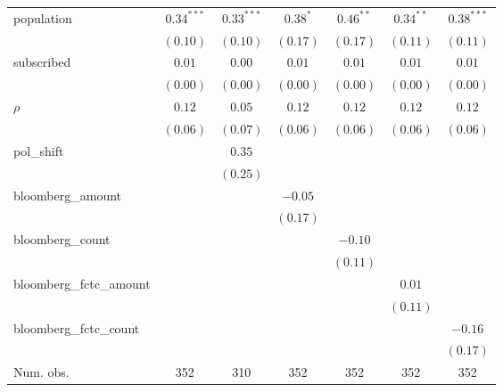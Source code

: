 \begin{table}[!h]
\begin{center}
\begin{tabular}{l c c c c c c }
population              & $0.34^{***}$ & $0.33^{***}$ & $0.38^{*}$   & $0.46^{**}$  & $0.34^{**}$  & $0.38^{***}$ \\
                        & $(0.10)$     & $(0.10)$     & $(0.17)$     & $(0.17)$     & $(0.11)$     & $(0.11)$     \\
subscribed              & $0.01$       & $0.00$       & $0.01$       & $0.01$       & $0.01$       & $0.01$       \\
                        & $(0.00)$     & $(0.00)$     & $(0.00)$     & $(0.00)$     & $(0.00)$     & $(0.00)$     \\
$\rho$                  & $0.12$       & $0.05$       & $0.12$       & $0.12$       & $0.12$       & $0.12$       \\
                        & $(0.06)$     & $(0.07)$     & $(0.06)$     & $(0.06)$     & $(0.06)$     & $(0.06)$     \\
pol\_shift              &              & $0.35$       &              &              &              &              \\
                        &              & $(0.25)$     &              &              &              &              \\
bloomberg\_amount       &              &              & $-0.05$      &              &              &              \\
                        &              &              & $(0.17)$     &              &              &              \\
bloomberg\_count        &              &              &              & $-0.10$      &              &              \\
                        &              &              &              & $(0.11)$     &              &              \\
bloomberg\_fctc\_amount &              &              &              &              & $0.01$       &              \\
                        &              &              &              &              & $(0.11)$     &              \\
bloomberg\_fctc\_count  &              &              &              &              &              & $-0.16$      \\
                        &              &              &              &              &              & $(0.17)$     \\
\midrule
Num. obs.               & 352          & 310          & 352          & 352          & 352          & 352          \\

\end{tabular}
\end{center}
\end{table}

